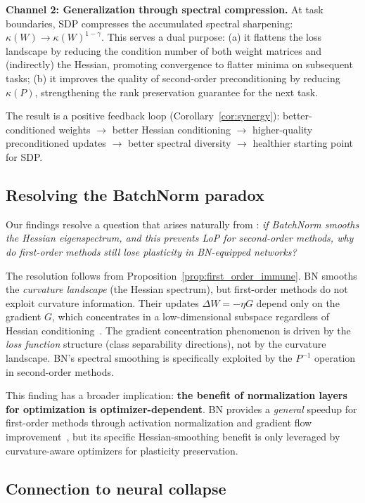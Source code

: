 \documentclass{article}
\begin{document}
\textbf{Channel 2: Generalization through spectral compression.} At task boundaries, SDP compresses the accumulated spectral sharpening: $\kappa(W) \to \kappa(W)^{1-\gamma}$. This serves a dual purpose: (a) it flattens the loss landscape by reducing the condition number of both weight matrices and (indirectly) the Hessian, promoting convergence to flatter minima on subsequent tasks; (b) it improves the quality of second-order preconditioning by reducing $\kappa(P)$, strengthening the rank preservation guarantee for the next task.

The result is a positive feedback loop (Corollary~\ref{cor:synergy}): better-conditioned weights $\to$ better Hessian conditioning $\to$ higher-quality preconditioned updates $\to$ better spectral diversity $\to$ healthier starting point for SDP.

\subsection{Resolving the BatchNorm paradox}

Our findings resolve a question that arises naturally from \citet{ghorbani2019investigation}: \emph{if BatchNorm smooths the Hessian eigenspectrum, and this prevents LoP for second-order methods, why do first-order methods still lose plasticity in BN-equipped networks?}

The resolution follows from Proposition~\ref{prop:first_order_immune}. BN smooths the \emph{curvature landscape} (the Hessian spectrum), but first-order methods do not exploit curvature information. Their updates $\Delta W = -\eta G$ depend only on the gradient $G$, which concentrates in a low-dimensional subspace regardless of Hessian conditioning~\citep{gurari2018gradient, ben2022high}. The gradient concentration phenomenon is driven by the \emph{loss function} structure (class separability directions), not by the curvature landscape. BN's spectral smoothing is specifically exploited by the $P^{-1}$ operation in second-order methods.

This finding has a broader implication: \textbf{the benefit of normalization layers for optimization is optimizer-dependent}. BN provides a \emph{general} speedup for first-order methods through activation normalization and gradient flow improvement~\citep{santurkar2018does}, but its specific Hessian-smoothing benefit is only leveraged by curvature-aware optimizers for plasticity preservation.

\subsection{Connection to neural collapse}
\end{document}
